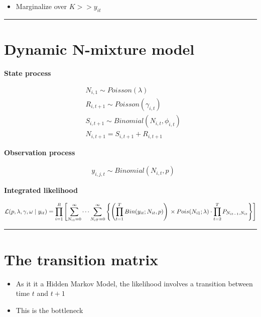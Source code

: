 \documentclass[
]{article}
\providecommand{\tightlist}{%
  \setlength{\itemsep}{0pt}\setlength{\parskip}{0pt}}
\begin{document}
\begin{itemize}
\tightlist
\item
  Marginalize over \(K >> y_{it}\)
\end{itemize}

\begin{center}\rule{0.5\linewidth}{0.5pt}\end{center}

\section{Dynamic N-mixture model}\label{dynamic-n-mixture-model-1}

\textbf{State process}

\[\begin{align*}
& N_{i,1} \sim Poisson(\lambda)\\
& R_{i,t+1} \sim Poisson(\gamma_{i,t})\\
& S_{i,t+1} \sim Binomial(N_{i,t}, \phi_{i,t})\\
& N_{i,t+1} = S_{i,t+1} + R_{i,t+1}
\end{align*}\]

\textbf{Observation process}

\[\begin{align*}
& y_{i,j,t} \sim Binomial(N_{i,t}, p)
\end{align*}\]

\textbf{Integrated likelihood}

\[\mathcal{L}(p, \lambda, \gamma, \omega \mid y_{it}) =
\prod_{i=1}^{R} \left[
  \sum_{N_{i1} = 0}^{\infty} \cdots \sum_{N_{iT} = 0}^{\infty}
  \left\{
  \left(
    \prod_{t=1}^{T} Bin(y_{it}; N_{it}, p)
  \right)\\
  \times Pois(N_{i1}; \lambda)
  \cdot \prod_{t=2}^{T} P_{N_{it-1}, N_{it}}
  \right\}
\right]\]

\begin{center}\rule{0.5\linewidth}{0.5pt}\end{center}

\section{The transition matrix}\label{the-transition-matrix}

\begin{itemize}
\item
  As it it a Hidden Markov Model, the likelihood involves a transition
  between time \(t\) and \(t+1\)
\item
  This is the bottleneck
\end{itemize}
\end{document}
